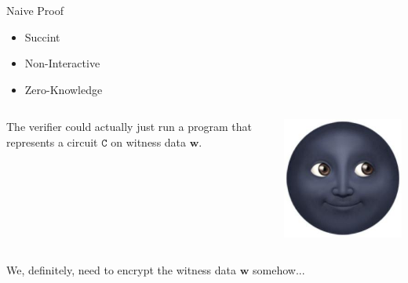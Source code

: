 \documentclass{zkdl-presentation-template}
\begin{document}
    \begin{frame}{Naive Proof}
        \begin{itemize}
            \item[\ding{55}] Succint
            \item[\ding{51}] Non-Interactive
            \item[\ding{55}] Zero-Knowledge
        \end{itemize}

        \pause
        \vspace{20pt}
        \begin{columns}
            \begin{column}{0.7\textwidth}
                The verifier could actually just run a program that represents a circuit 
                $\mathtt{C}$ on witness data $\boldsymbol{w}$.
            \end{column}

            \begin{column}{0.2\textwidth}
                \includegraphics[width=\linewidth]{../presentations/images/common/new-moon-with-face.jpg}
            \end{column}
        \end{columns}\pause

        We, definitely, need to encrypt the witness data $\boldsymbol{w}$ somehow...
    \end{frame}
\end{document}
